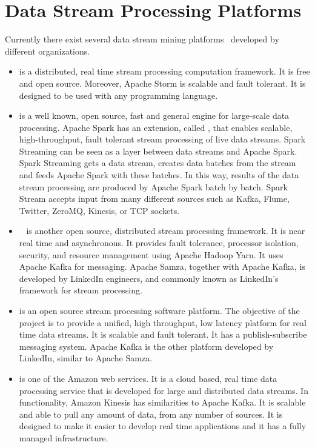 \documentclass[smallcondensed]{svjour3}     %
\begin{document}
%
\section{Data Stream Processing Platforms}
\label{sec:streamPlatforms}
Currently there exist several data stream mining platforms~\citep{platforms:JANARDAN2017804, platforms:prasad2016stream} developed by different organizations. 
\begin{itemize}
	\item \textbf{\citet{ApacheStorm}} is a distributed, real time stream processing computation framework. It is free and open source. Moreover, Apache Storm is scalable and fault tolerant. It is designed to be used with any programming language.
	\item \textbf{\citet{ApacheSpark}} is a well known, open source, fast and general engine for large-scale data processing. Apache Spark has an extension, called \textbf{\citet{SparkStreaming}}, that enables scalable, high-throughput, fault tolerant stream processing of live data streams. Spark Streaming can be seen as a layer between data streams and Apache Spark. Spark Streaming gets a data stream, creates data batches from the stream and feeds Apache Spark with these batches. In this way, results of the data stream processing are produced by Apache Spark batch by batch. Spark Stream accepts input from many different sources such as Kafka, Flume, Twitter, ZeroMQ, Kinesis, or TCP sockets.
	\item \textbf{\citet{ApacheSamza}}~\citep{SamzaLinkedin} is another open source, distributed stream processing framework. It is near real time and asynchronous. It provides fault tolerance, processor isolation, security, and resource management using Apache Hadoop Yarn. It uses Apache Kafka for messaging. Apache Samza, together with Apache Kafka, is developed by LinkedIn engineers, and commonly known as LinkedIn’s framework for stream processing.
	\item \textbf{\citet{ApacheKafka}} is an open source stream processing software platform. The objective of the project is to provide a unified, high throughput, low latency platform for real time data streams. It is scalable and fault tolerant. It has a publish-subscribe messaging system. Apache Kafka is the other platform developed by LinkedIn, similar to Apache Samza.
	\item \textbf{\citet{AmazonKinesis}} is one of the Amazon web services. It is a cloud based, real time data processing service that is developed for large and distributed data streams. In functionality, Amazon Kinesis has similarities to Apache Kafka. It is scalable and able to pull any amount of data, from any number of sources. It is designed to make it easier to develop real time applications and it has a fully managed infrastructure. 

\end{itemize}
\end{document}

